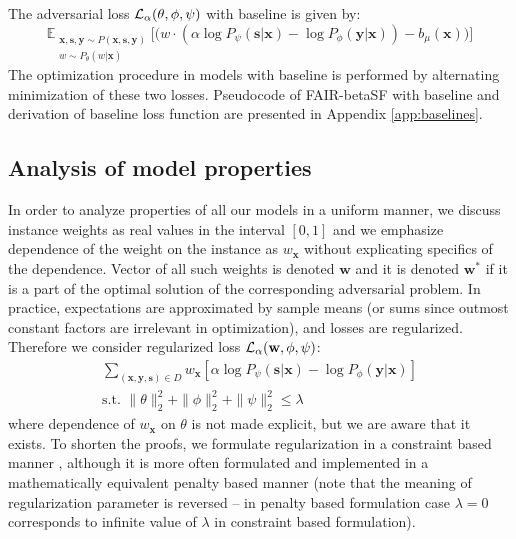 \documentclass[preprint,12pt]{elsarticle}
\begin{document}
The adversarial loss ${\cal L}_{\alpha}(\theta, \phi, \psi)$ with baseline is given by:
\begin{equation}
\label{Eq.ADVBaseline-loss}
\mathbb{E}_{\substack{\mathbf{x}, \mathbf{s}, \mathbf{y}\sim P(\mathbf{x},\mathbf{s}, \mathbf{y})\\w \sim P_\theta(w|\mathbf{x})}} \Big[ \big(
w \cdot ( \alpha \log P_\psi(\mathbf{s}|\mathbf{x}) - \log P_\phi(\mathbf{y}|\mathbf{x})) - b_\mu(\mathbf{x})\big)\Big]
\end{equation}
The optimization procedure in models with baseline is performed by alternating minimization of these two losses.
Pseudocode of FAIR-betaSF with baseline and derivation of baseline loss function are presented in Appendix \ref{app:baselines}.
\fi


\subsection{Analysis of model properties}

In order to analyze properties of all our models in a uniform manner, we discuss instance weights as real values in the interval $[0,1]$ and we emphasize dependence of the weight on the instance as $w_\mathbf{x}$ without explicating specifics of the dependence. Vector of all such weights is denoted $\mathbf{w}$ and it is denoted $\mathbf{w}^*$ if it is a part of the optimal solution of the corresponding adversarial problem.
In practice, expectations are approximated by sample means (or sums since outmost constant factors are irrelevant in optimization), and losses are regularized. Therefore we consider regularized loss ${\cal L}_{\alpha}(\mathbf{w}, \phi, \psi)$:
\begin{equation}
\label{Eq:Loss-scalar-new}
\begin{split}
\sum_{(\mathbf{x},\mathbf{y},\mathbf{s})\in D} w_\mathbf{x} [\alpha\log P_{\psi}(\mathbf{s}|\mathbf{x}) -  \log P_{\phi}(\mathbf{y}|\mathbf{x})]\\
\text{s.t. }\|\theta\|^2_2+\|\phi\|^2_2+\|\psi\|^2_2\leq \lambda
\end{split}
\end{equation}
where dependence of $w_\mathbf{x}$ on $\theta$ is not made explicit, but we are aware that it exists.
To shorten the proofs, we formulate regularization in a constraint based manner \cite{tibshirani1996regression}, although it is more often formulated and implemented in a mathematically equivalent penalty based manner (note that the meaning of regularization parameter is reversed -- in penalty based formulation case $\lambda=0$ corresponds to infinite value of $\lambda$ in constraint based formulation).
\end{document}
